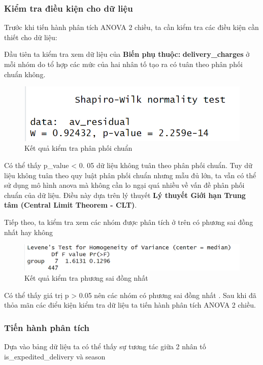 \subsubsection{Kiểm tra điều kiện cho dữ liệu}
Trước khi tiến hành phân tích ANOVA 2 chiều, ta cần kiểm tra các điều kiện cần thiết cho dữ liệu:


 Đầu tiên ta kiểm tra xem dữ liệu của \textbf{Biến phụ thuộc:} \textbf{delivery\_charges} ở mỗi nhóm do tổ hợp các mức của hai nhân tố tạo ra có tuân theo phân phối chuẩn không.
 \begin{figure}[!htbp]
    \centering
    \includegraphics[width=0.7\linewidth]{graphics/5.4.1 (2).png}
    \caption{Kết quả kiểm tra phân phối chuẩn}
\end{figure}
\FloatBarrier

Có thể thấy p\_value < 0. 05 dữ liệu không tuân theo phân phối chuẩn.
Tuy dữ liệu không tuân theo quy luật phân phối chuẩn nhưng mẫu đủ lớn, ta vẫn có thể sử dụng mô hình anova mà không cần lo ngại quá nhiều về vấn đề phân phối chuẩn của dữ liệu. Điều này dựa trên lý thuyết \textbf{Lý thuyết Giới hạn Trung tâm (Central Limit Theorem - CLT)}. 


   Tiếp theo, ta kiểm tra xem các nhóm được phân tích ở trên có phương sai đồng nhất hay không 

   \begin{figure}[!htbp]
    \centering
    \includegraphics[width=0.7\linewidth]{graphics/5.4.2.png}
    \caption{Kết quả kiểm tra phương sai đồng nhất}
\end{figure}

Có thể thấy giá trị p > 0.05 nên các nhóm có phương sai đồng nhất . 
Sau khi đã thỏa mãn các điểu kiện kiểm tra dữ liệu ta tiến hành phân tích ANOVA 2 chiều.

\subsubsection{Tiến hành phân tích}


        Dựa vào bảng dữ liệu ta có thể thấy sự tương tác giữa 2 nhân tố is\_expedited\_delivery và season

